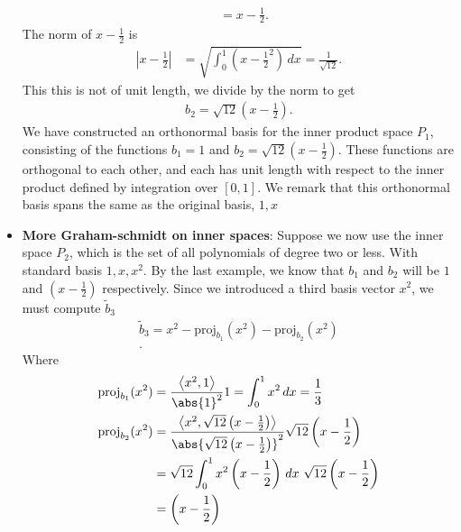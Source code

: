 \documentclass{report}
\begin{document}
\begin{itemize}
\begin{align*}
                              &= x-\frac{1}{2}
            .\end{align*}
            The norm of $x-\frac{1}{2}$ is 
            \begin{align*}
               \left|x-\frac{1}{2}\right| &= \sqrt{\int_{0}^{1} \left(x-\frac{1}{2}^{2}\right) \, dx} = \frac{1}{\sqrt{12}}
            .\end{align*}
            This this is not of unit length, we divide by the norm to get
            \begin{align*}
                b_{2} = \sqrt{12}\left(x-\frac{1}{2}\right)
            .\end{align*}
            \bigbreak \noindent 
            We have constructed an orthonormal basis for the inner product space \( P_1 \), consisting of the functions \( b_1 = 1 \) and \( b_2 = \sqrt{12} \left(x - \frac{1}{2}\right) \). These functions are orthogonal to each other, and each has unit length with respect to the inner product defined by integration over \([0,1]\).
            \bigbreak \noindent 
            We remark that this orthonormal basis spans the same as the original basis, $1,x$
        \item \textbf{More Graham-schmidt on inner spaces}: Suppose we now use the inner space $P_{2}$, which is the set of all polynomials of degree two or less. With standard basis $1,x,x^{2}$. By the last example, we know that $b_{1}$ and $b_{2}$ will be $1$ and $\left(x-\frac{1}{2}\right)$ respectively. Since we introduced a third basis vector $x^{2}$, we must compute $\tilde{b}_{3} $
            \begin{align*}
                \tilde{b}_{3} = x^{2} - \text{proj}_{b_{1}}(x^{2}) - \text{proj}_{b_{2}}(x^{2}) \\
            .\end{align*}
            Where 
            \begin{align*}
                \text{proj}_{b_{1}}(x^{2}) &= \frac{\left\langle x^{2},1 \right\rangle}{\abs{1}^{2}}1 = \int_{0}^{1} x^{2} \, dx = \frac{1}{3} \\
                \text{proj}_{b_{2}}(x^{2}) &= \frac{\left\langle x^{2},\sqrt{12}\left(x-\frac{1}{2}\right) \right\rangle}{\abs{\sqrt{12}\left(x-\frac{1}{2}\right)}^{2}}\sqrt{12}\left(x-\frac{1}{2}\right)  \\
                                           &= \sqrt{12}\int_{0}^{1}  x^{2}\left(x-\frac{1}{2}\right)\, dx \ \sqrt{12}\left(x-\frac{1}{2}\right) \\
                                           &= \left(x-\frac{1}{2}\right)

\end{align*}
\end{itemize}
\end{document}
